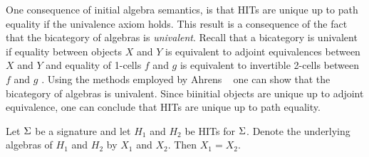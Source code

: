 One consequence of initial algebra semantics, is that HITs are unique up to path equality if the univalence axiom holds.
This result is a consequence of the fact that the bicategory of algebras is \emph{univalent}.
Recall that a bicategory is univalent if
equality between objects $X$ and $Y$ is equivalent to adjoint equivalences between $X$ and $Y$
and equality of 1-cells $f$ and $g$ is equivalent to invertible 2-cells between $f$ and $g$
\cite{bicatjournal}.
Using the methods employed by Ahrens \etal \ \cite{bicatjournal} one can show that the bicategory of algebras
is univalent.
Since biinitial objects are unique up to adjoint equivalence, one can conclude that HITs are unique up
to path equality.

\begin{proposition}
Let $\Sigma$ be a signature and let $H_1$ and $H_2$ be HITs for $\Sigma$.
Denote the underlying algebras of $H_1$ and $H_2$ by $X_1$ and $X_2$.
Then $X_1 = X_2$.
\end{proposition}
